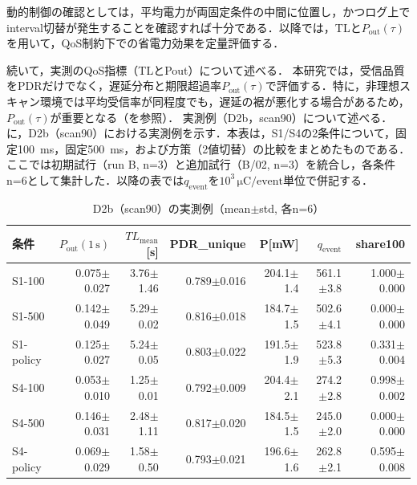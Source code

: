 動的制御の確認としては，平均電力が両固定条件の中間に位置し，かつログ上でinterval切替が発生することを確認すれば十分である．以降では，TLと$P_{\mathrm{out}}(\tau)$を用いて，QoS制約下での省電力効果を定量評価する．

続いて，実測のQoS指標（TLとPout）について述べる．
本研究では，受信品質をPDRだけでなく，遅延分布と期限超過率$P_{\mathrm{out}}(\tau)$で評価する．特に，非理想スキャン環境では平均受信率が同程度でも，遅延の裾が悪化する場合があるため，$P_{\mathrm{out}}(\tau)$が重要となる（を参照）．
\noindent 実測例（D2b，scan90）について述べる．
に，D2b（scan90）における実測例を示す．本表は，S1/S4の2条件について，固定\SI{100}{\milli\second}，固定\SI{500}{\milli\second}，および方策（2値切替）の比較をまとめたものである．ここでは初期試行（run B, n=3）と追加試行（B/02, n=3）を統合し，各条件n=6として集計した．以降の表では$q_{\mathrm{event}}$を$10^3\,\si{\micro\coulomb}/\text{event}$単位で併記する．

\begin{table}[tb]
  \centering
  \caption{D2b（scan90）の実測例（mean$\pm$std, 各n=6）}
  \label{tab:d2_summary}
  {\scriptsize
  \setlength{\tabcolsep}{3pt}
  \begin{tabular}{lrrrrrr}
    \toprule
    条件 & $P_{\mathrm{out}}(1\,\mathrm{s})$ & $TL_{\mathrm{mean}}$[s] & PDR\_unique & P[mW] & $q_{\mathrm{event}}$ & share100 \\
    \midrule
    S1-100   & 0.075$\pm$0.027 & 3.76$\pm$1.46 & 0.789$\pm$0.016 & 204.1$\pm$1.4 & 561.1$\pm$3.8 & 1.000$\pm$0.000 \\
    S1-500   & 0.142$\pm$0.049 & 5.29$\pm$0.02 & 0.816$\pm$0.018 & 184.7$\pm$1.5 & 502.6$\pm$4.1 & 0.000$\pm$0.000 \\
    S1-policy & 0.125$\pm$0.027 & 5.24$\pm$0.05 & 0.803$\pm$0.022 & 191.5$\pm$1.9 & 523.8$\pm$5.3 & 0.331$\pm$0.004 \\
    \midrule
    S4-100   & 0.053$\pm$0.010 & 1.25$\pm$0.01 & 0.792$\pm$0.009 & 204.4$\pm$2.1 & 274.2$\pm$2.8 & 0.998$\pm$0.002 \\
    S4-500   & 0.146$\pm$0.031 & 2.48$\pm$1.11 & 0.817$\pm$0.020 & 184.5$\pm$1.5 & 245.0$\pm$2.0 & 0.000$\pm$0.000 \\
    S4-policy & 0.069$\pm$0.029 & 1.58$\pm$0.50 & 0.793$\pm$0.021 & 196.6$\pm$1.6 & 262.8$\pm$2.1 & 0.595$\pm$0.008 \\
    \bottomrule
  \end{tabular}
  }
\end{table}

